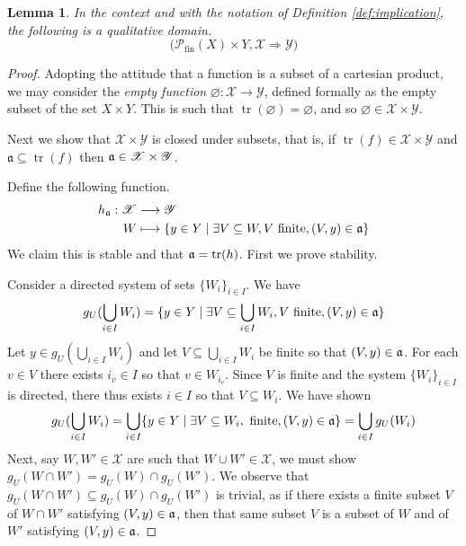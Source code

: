 \documentclass[12pt]{article}
\theoremstyle{plain}
\newtheorem{lemma}[thm]{Lemma}
\theoremstyle{definition}
\newcommand{\scr}[1]{\mathscr{#1}}
\newcommand{\call}[1]{\mathcal{#1}}
\newcommand{\lto}{\longrightarrow}
\begin{document}
	\begin{lemma}\label{lem:implication_qd}
		In the context and with the notation of Definition \ref{def:implication}, the following is a qualitative domain.
		\begin{equation}
			\big(\call{P}_{\text{fin}}(X) \times Y, \scr{X} \Rightarrow \scr{Y}\big)
			\end{equation}
		\end{lemma}
	\begin{proof}
		Adopting the attitude that a function is a subset of a cartesian product, we may consider the \emph{empty function} $\varnothing: \scr{X} \lto \scr{Y}$, defined formally as the empty subset of the set $X \times Y$. This is such that $\operatorname{tr}(\varnothing) = \varnothing$, and so $\varnothing \in \scr{X} \times \scr{Y}$.
		
		Next we show that $\scr{X} \times \scr{Y}$ is closed under subsets, that is, if $\operatorname{tr}(f) \in \scr{X} \times \scr{Y}$ and $\mathfrak{a} \subseteq \operatorname{tr}(f)$ then $\frak{a} \in \scr{X} \times \scr{Y}$.
		
		Define the following function.
		\begin{align}
			\label{eq:subset}h_{\frak{a}}: \scr{X} &\lto \scr{Y}\\
			W &\longmapsto \{ y \in Y \mid \exists V \subseteq W, V \text{ finite}, (V, y) \in \frak{a} \}
			\end{align}
		We claim this is stable and that $\frak{a} =\operatorname{tr}(h)$. First we prove stability.
		
		Consider a directed system of sets $\{ W_i \}_{i \in I}$. We have
		\begin{equation}
			g_U(\bigcup_{i \in I}W_i) = \{ y \in Y \mid \exists V \subseteq \bigcup_{i \in I}W_i, V\text{ finite}, (V,y) \in \frak{a} \}
			\end{equation}
		Let $y \in g_U(\bigcup_{i \in I}W_i)$ and let $V \subseteq \bigcup_{i \in I}W_i$ be finite so that $(V,y) \in \frak{a}$. For each $v \in V$ there exists $i_v \in I$ so that $v \in W_{i_v}$. Since $V$ is finite and the system $\{ W_i \}_{i \in I}$ is directed, there thus exists $i \in I$ so that $V \subseteq W_i$. We have shown
		\begin{equation}
			g_U(\bigcup_{i \in I}W_i) = \bigcup_{i \in I}\{ y \in Y \mid \exists V \subseteq W_i,\text{ finite}, (V,y) \in \frak{a} \} = \bigcup_{i \in I}g_U(W_i)
			\end{equation}
		Next, say $W, W' \in \scr{X}$ are such that $W \cup W' \in \scr{X}$, we must show $g_U(W \cap W') = g_U(W) \cap g_U(W')$. We observe that $g_U(W \cap W') \subseteq g_U(W) \cap g_U(W')$ is trivial, as if there exists a finite subset $V$ of $W \cap W'$ satisfying $(V,y) \in \frak{a}$, then that same subset $V$ is a subset of $W$ and of $W'$ satisfying $(V,y) \in \frak{a}$.
		

\end{proof}
\end{document}
